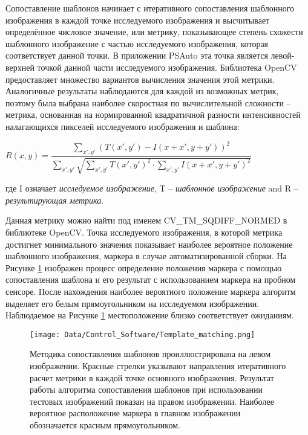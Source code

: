 Сопоставление шаблонов начинает с итеративного сопоставления шаблонного изображения в каждой точке исследуемого изображения и высчитывает определённое числовое значение, или метрику, показывающее степень схожести шаблонного изображение с частью исследуемого изображения, которая соответствует данной точки. В приложении PSAuto эта точка является левой-верхней точкой данной части исследуемого изображения. Библиотека OpenCV предоставляет множество вариантов вычисления значения этой метрики. Аналогичные результаты наблюдаются для каждой из возможных метрик, поэтому была выбрана наиболее скоростная по вычислительной сложности -- метрика, основанная на нормированной квадратичной разности интенсивностей налагающихся пикселей исследуемого изображения и шаблона:

\begin{center}
$R(x,y)=\dfrac{\sum_{x',y'}^{}(T(x',y')-I(x+x',y+y'))^{2}}{\sum_{x',y'}^{}\sqrt{\sum_{x',y'}^{}T(x',y')^{2}\cdot\sum_{x',y'}^{}I(x+x',y+y')^{2}}}$
\end{center}
где I означает \emph{исследуемое изображение}, T -- \emph{шаблонное изображение} and R -- \emph{результирующая метрика}.


Данная метрику можно найти под именем CV\_TM\_SQDIFF\_NORMED в библиотеке OpenCV. Точка исследуемого изображения, в которой метрика достигнет минимального значения показывает наиболее вероятное положение шаблонного изображения, маркера в случае автоматизированной сборки. На Рисунке \ref{fig:template_matching} изображен процесс определение положения маркера с помощью сопоставления шаблона и его результат с использованием маркера на пробном сенсоре. После нахождения наиболее вероятного положение маркера алгоритм выделяет его белым прямоугольником на исследуемом изображении. Наблюдаемое на Рисунке \ref{fig:template_matching} местоположение близко соответствует ожиданиям.

\begin{figure}[ht]\centering
\texttt{[image: Data/Control\_Software/Template\_matching.png]}
\caption{Методика сопоставления шаблонов проиллюстрирована на левом изображении. Красные стрелки указывают направления итеративного расчет метрики в каждой точке основного изображения. Результат работы алгоритма сопоставления шаблонов при использовании тестовых изображений показан на правом изображении. Наиболее вероятное расположение маркера в главном изображении обозначается красным прямоугольником.}
\label{fig:template_matching}
\end{figure}

